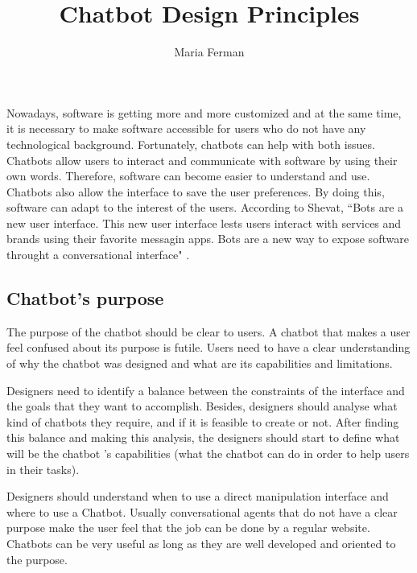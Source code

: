 \documentclass[a4paper,10pt]{article}
\title{Chatbot Design Principles}
\author{Maria Ferman}
\begin{document}
\maketitle
Nowadays, software is getting more and more customized and at the same time, it is necessary to make software accessible for users who do not have any technological background. Fortunately, chatbots can help with both issues. Chatbots allow users to interact and communicate with software by using their own words. Therefore, software can become easier to understand and use. Chatbots also allow the interface to save the user preferences. By doing this, software can adapt to the interest of the users. According to Shevat,  ``Bots are a new user interface. This new user interface lests users interact with services and brands using their favorite messagin apps. Bots are a new way to expose software throught a conversational interface" \cite{Shevat2017}. 

\subsection*{Chatbot's purpose}

The purpose of the chatbot should be clear to users. A chatbot that makes a user feel confused about its purpose is futile. Users need to have a clear understanding of why the chatbot was designed and what are its capabilities and limitations. 

Designers need to identify a balance between the constraints of the interface and the goals that they want to accomplish. Besides, designers should analyse what kind of chatbots they require, and if it is feasible to create or not. After finding this balance and making this analysis, the designers should start to define what will be the chatbot 's capabilities (what the chatbot can do in order to help users in their tasks). 

Designers should understand when to use a direct manipulation interface and where to use a Chatbot. Usually conversational agents that do not have a clear purpose make the user feel that the job can be done by a regular website. Chatbots can be very useful as long as they are well developed and oriented to the purpose. %
\end{document}
